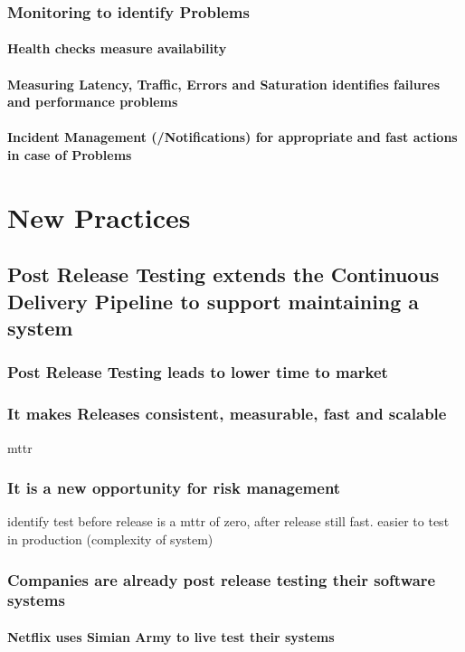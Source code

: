 \section{Monitoring to identify Problems}
\subsection{Health checks measure availability}
\subsection{Measuring Latency, Traffic, Errors and Saturation identifies failures and performance problems}
\subsection{Incident Management (/Notifications) for appropriate and fast actions in case of Problems}

\part{New Practices}
\chapter{Post Release Testing extends the Continuous Delivery Pipeline to support maintaining a system}
\section{Post Release Testing leads to lower time to market}
\section{It makes Releases consistent, measurable, fast and scalable}
mttr
\section{It is a new opportunity for risk management}
identify test before release is a mttr of zero, after release still fast. easier to test in production (complexity of system)

\section{Companies are already post release testing their software systems}
\subsection{Netflix uses Simian Army to live test their systems}
